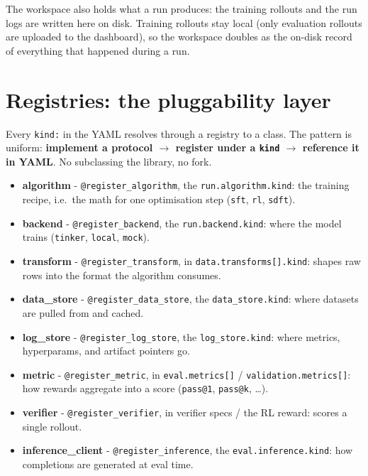 \documentclass[11pt]{article}
\newcommand{\code}[1]{\texttt{\small #1}}
\begin{document}
The workspace also holds what a run produces: the training rollouts and the run
logs are written here on disk. Training rollouts stay local (only evaluation
rollouts are uploaded to the dashboard), so the workspace doubles as the on-disk
record of everything that happened during a run.

\section{Registries: the pluggability layer}

Every \code{kind:} in the YAML resolves through a registry to a class. The
pattern is uniform: \textbf{implement a protocol $\to$ register under a
\code{kind} $\to$ reference it in YAML}. No subclassing the library, no fork.

\begin{itemize}\setlength\itemsep{3pt}
  \item \textbf{algorithm} - \code{@register\_algorithm}, the \code{run.algorithm.kind}: the training recipe, i.e.\ the math for one optimisation step (\code{sft}, \code{rl}, \code{sdft}).
  \item \textbf{backend} - \code{@register\_backend}, the \code{run.backend.kind}: where the model trains (\code{tinker}, \code{local}, \code{mock}).
  \item \textbf{transform} - \code{@register\_transform}, in \code{data.transforms[].kind}: shapes raw rows into the format the algorithm consumes.
  \item \textbf{data\_store} - \code{@register\_data\_store}, the \code{data\_store.kind}: where datasets are pulled from and cached.
  \item \textbf{log\_store} - \code{@register\_log\_store}, the \code{log\_store.kind}: where metrics, hyperparams, and artifact pointers go.
  \item \textbf{metric} - \code{@register\_metric}, in \code{eval.metrics[]} / \code{validation.metrics[]}: how rewards aggregate into a score (\code{pass@1}, \code{pass@k}, \dots).
  \item \textbf{verifier} - \code{@register\_verifier}, in verifier specs / the RL reward: scores a single rollout.
  \item \textbf{inference\_client} - \code{@register\_inference}, the \code{eval.inference.kind}: how completions are generated at eval time.
\end{itemize}
\end{document}
